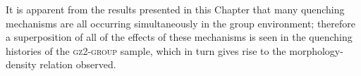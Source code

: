 \begin{enumerate}[(i)]
It is apparent from the results presented in this Chapter that many quenching mechanisms are all occurring simultaneously in the group environment; therefore a superposition of all of the effects of these mechanisms is seen in the quenching histories of the \textsc{gz2-group} sample, which in turn gives rise to the morphology-density relation observed. 
 
  
\end{enumerate}
